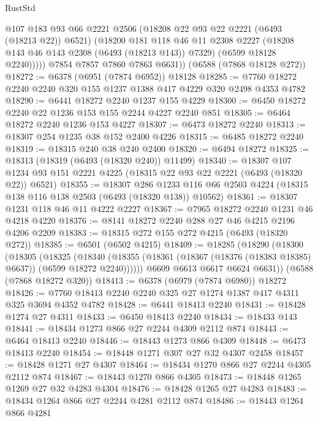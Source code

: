 \begin{lexlean}{RustStd}
\begin{coremodule}
              @107
              @183
              @93
              @66
              @2221
              @2506
              (@18208 @22 @93 @22 @2221 (@6493 (@18213 @22)) @6521)
              (@18200
                @181
                @118
                @46
                @11
                @2308
                @2227
                (@18208 @143 @46 @143 @2308 (@6493 (@18213 @143)) @7329)
                (@6599 @18128 @2240)))))
        @7854
        @7857
        @7860
        @7863
        @6631))
    (@6588 (@7868 @18128 @272))
@18272 := @6378 (@6951 (@7874 @6952)) @18128
@18285 := @7760 @18272 @2240 @2240 @320 @155 @1237 @1388 @417 @4229 @320 @2498 @4353 @4782
@18290 := @6441 @18272 @2240 @1237 @155 @4229
@18300 := @6450 @18272 @2240 @22 @1236 @153 @155 @2244 @4227 @2240 @851
@18305 := @6464 @18272 @2240 @1236 @153 @4227
@18307 := @6473 @18272 @2240
@18313 := @18307 @254 @1235 @38 @152 @2400 @4226
@18315 := @6485 @18272 @2240
@18319 := @18315 @240 @38 @240 @2400
@18320 := @6494 @18272
@18325 := @18313 (@18319 (@6493 (@18320 @240)) @11499)
@18340 := @18307
    @107
    @1234
    @93
    @151
    @2221
    @4225
    (@18315 @22 @93 @22 @2221 (@6493 (@18320 @22)) @6521)
@18355 := @18307
    @286
    @1233
    @116
    @66
    @2503
    @4224
    (@18315 @138 @116 @138 @2503 (@6493 (@18320 @138)) @10562)
@18361 := @18307 @1231 @118 @46 @11 @4222 @2227
@18367 := @7965 @18272 @2240 @1231 @46 @4218 @4220
@18376 := @8141 @18272 @2240 @288 @27 @46 @4215 @2196 @4206 @2209
@18383 := @18315 @272 @155 @272 @4215 (@6493 (@18320 @272))
@18385 := @6501 (@6502 @4215)
@18409 := @18285
    (@18290
      (@18300
        (@18305
          (@18325
            (@18340
              (@18355 (@18361 (@18367 (@18376 (@18383 @18385) @6637)) (@6599 @18272 @2240))))))
        @6609
        @6613
        @6617
        @6624
        @6631))
    (@6588 (@7868 @18272 @320))
@18413 := @6378 (@6979 (@7874 @6980)) @18272
@18426 := @7760 @18413 @2240 @2240 @325 @27 @1274 @1387 @417 @4311 @325 @3694 @4352 @4782
@18428 := @6441 @18413 @2240
@18431 := @18428 @1274 @27 @4311
@18433 := @6450 @18413 @2240
@18434 := @18433 @143
@18441 := @18434 @1273 @866 @27 @2244 @4309 @2112 @874
@18443 := @6464 @18413 @2240
@18446 := @18443 @1273 @866 @4309
@18448 := @6473 @18413 @2240
@18454 := @18448 @1271 @307 @27 @32 @4307 @2458
@18457 := @18428 @1271 @27 @4307
@18464 := @18434 @1270 @866 @27 @2244 @4305 @2112 @874
@18467 := @18443 @1270 @866 @4305
@18473 := @18448 @1265 @1269 @27 @32 @4283 @4304
@18476 := @18428 @1265 @27 @4283
@18483 := @18434 @1264 @866 @27 @2244 @4281 @2112 @874
@18486 := @18443 @1264 @866 @4281

\end{coremodule}
\end{lexlean}
